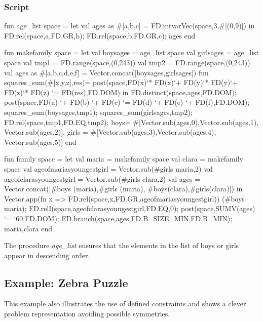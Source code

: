\documentclass[a4paper]{scrartcl}
\begin{document}
\subsubsection{Script}

\begin{myverbatim}
fun age_list space =
    let
        val ages as #[a,b,c] = FD.intvarVec(space,3,#[(0,9)])
    in 
        FD.rel(space,a,FD.GR,b);
        FD.rel(space,b,FD.GR,c);
        ages
    end

fun makefamily space =
    let
        val boysages  = age_list space
        val girlsages = age_list space
        val tmp1 = FD.range(space,(0,243))
        val tmp2 = FD.range(space,(0,243))
        val ages as #[a,b,c,d,e,f] = 
                Vector.concat([boysages,girlsages])
        fun squares_sum(#[x,y,z],res)= 
            post(space,FD(x)`* FD(x)`+ 
                       FD(y)`* FD(y)`+
                       FD(z)`* FD(z) `= FD(res),FD.DOM)
    in
        FD.distinct(space,ages,FD.DOM);
        post(space,FD(a) `+ FD(b) `+ FD(c) 
                `= FD(d) `+ FD(e) `+ FD(f),FD.DOM);
        squares_sum(boysages,tmp1);
        squares_sum(girlsages,tmp2);
        FD.rel(space,tmp1,FD.EQ,tmp2);
        {boys= #[Vector.sub(ages,0),Vector.sub(ages,1),
                 Vector.sub(ages,2)],
         girls = #[Vector.sub(ages,3),Vector.sub(ages,4),
                   Vector.sub(ages,5)]}
    end

fun family space = 
    let
        val maria = makefamily space
        val clara = makefamily space
        val ageofmariasyoungestgirl = Vector.sub(#girls maria,2)
        val ageofclarasyoungestgirl = Vector.sub(#girls clara,2)
        val ages = Vector.concat([#boys (maria),#girls (maria),
                                  #boys(clara),#girls(clara)])
    in
        Vector.app(fn x => 
              FD.rel(space,x,FD.GR,ageofmariasyoungestgirl))
                  (#boys maria);
        FD.relI(space,ageofclarasyoungestgirl,FD.EQ,0);
        post(space,SUMV(ages) `= `60,FD.DOM);
        FD.branch(space,ages,FD.B_SIZE_MIN,FD.B_MIN);
        {maria,clara}
    end         
 
\end{myverbatim}

The procedure {\it age\_list} ensures that
the elements in the list of boys or girls appear in 
descending order.



\newpage
\subsection{Example: Zebra Puzzle}
This example also illustrates the use of defined constraints and
shows a clever problem representation avoiding possible symmetries.
\end{document}
